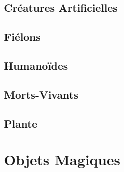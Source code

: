 \documentclass{dd}
\begin{document}


\section{Créatures Artificielles}









\section{Fiélons}

%
%

%



\section{Humanoïdes}










\section{Morts-Vivants}









\section{Plante}


\chapter{Objets Magiques}
\end{document}
